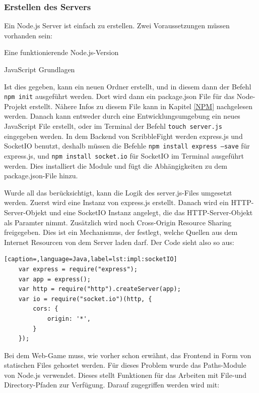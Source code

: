 \subsubsection{Erstellen des Servers}
Ein Node.js Server ist einfach zu erstellen. Zwei Voraussetzungen müssen vorhanden sein:

\begin{compactitem}
    \item Eine funktionierende Node.js-Version
    \item JavaScript Grundlagen
\end{compactitem}

Ist dies gegeben, kann ein neuen Ordner erstellt, und in diesem dann der Befehl \texttt{npm init} ausgeführt werden.
Dort wird dann ein package.json File für das Node-Projekt erstellt. Nähere Infos zu diesem File kann in Kapitel \ref{NPM} nachgelesen werden.
Danach kann entweder durch eine Entwicklungsumgebung ein neues JavaScript File erstellt, oder im Terminal der Befehl \texttt{touch server.js} eingegeben werden.
In dem Backend von ScribbleFight werden express.js und SocketIO benutzt, deshalb müssen die Befehle \texttt{npm install express --save} für express.js, und
\texttt{npm install socket.io} für SocketIO im Terminal ausgeführt werden. Dies installiert die Module und fügt die Abhängigkeiten zu dem package.json-File hinzu.

Wurde all das berücksichtigt, kann die Logik des server.js-Files umgesetzt werden. Zuerst wird eine Instanz von express.js erstellt.
Danach wird ein HTTP-Server-Objekt und eine SocketIO Instanz angelegt, die das HTTP-Server-Objekt als Paramter nimmt. Zusätzlich wird noch Cross-Origin Resource Sharing freigegeben.
Dies ist ein Mechanismus, der festlegt, welche Quellen aus dem Internet Resourcen von dem Server laden darf. \cite{cors}
Der Code sieht also so aus:

\begin{lstlisting}[caption=,language=Java,label=lst:impl:socketIO]
    var express = require("express");
    var app = express();
    var http = require("http").createServer(app);
    var io = require("socket.io")(http, {
        cors: {
            origin: '*',
        }
    });
\end{lstlisting}

Bei dem Web-Game muss, wie vorher schon erwähnt, das Frontend in Form von statischen Files gehostet werden.
Für dieses Problem wurde das Paths-Module von Node.js verwendet. Dieses stellt Funktionen für das Arbeiten mit File-und Directory-Pfaden zur Verfügung. Darauf zugegriffen werden wird mit:

